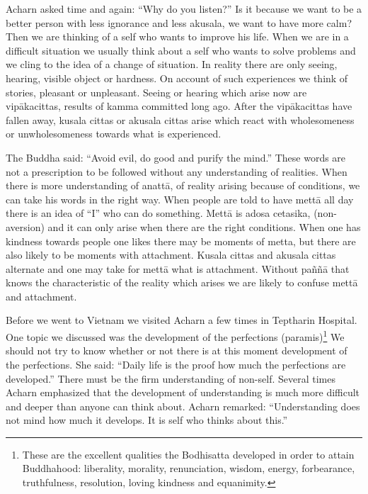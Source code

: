 {Acharn asked time and again: ``Why do you listen?'' Is it
because we want to be a better person with less ignorance and less
akusala, we want to have more calm? Then we are thinking of a self who
wants to improve his life. When we are in a difficult situation we
usually think about a self who wants to solve problems and we cling to
the idea of a change of situation. In reality there are only seeing,
hearing, visible object or hardness. On account of such experiences we
think of stories, pleasant or unpleasant. Seeing or hearing which arise
now are vipākacittas, results of kamma committed long ago. After the
vipākacittas have fallen away, kusala cittas or akusala cittas arise
which react with wholesomeness or unwholesomeness towards what is
experienced.

The Buddha said: ``Avoid evil, do good and purify the mind.''
These words are not a prescription to be followed without any
understanding of realities. When there is more understanding of anattā,
of reality arising because of conditions, we can take his words in the
right way. When people are told to have mettā all day there is an idea
of ``I'' who can do something. Mettā is adosa cetasika, (non-aversion)
and it can only arise when there are the right conditions.
When one has kindness towards people one
likes there may be moments of metta, but there are also
likely to be moments with attachment. Kusala cittas and akusala cittas
alternate and one may take for mettā what is attachment. Without paññā
that knows the characteristic of the reality which arises we are likely
to confuse mettā and attachment.

Before we went to Vietnam we visited Acharn a few times in
Teptharin Hospital. One topic we discussed was the development of the
perfections (paramis)\footnote{These are the excellent
qualities the Bodhisatta developed in order to attain Buddhahood:
liberality, morality, renunciation, wisdom, energy, forbearance,
truthfulness, resolution, loving kindness and equanimity.}
We should not try to know whether or not there is at this moment
development of the perfections. She said: ``Daily life is the proof how
much the perfections are developed.'' There must be the firm
understanding of non-self. Several times Acharn emphasized that the
development of understanding is much more difficult and deeper than
anyone can think about. Acharn remarked: ``Understanding does not mind
how much it develops. It is self who thinks about this.''

}
